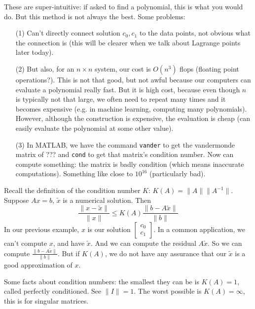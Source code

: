 \documentclass{article}
\theoremstyle{plain}
\theoremstyle{remark}
\begin{document}
These are super-intuitive: if asked to find a polynomial,
this is what you would do.
But this method is not always the best. Some problems:
\begin{enumerate}
	\item[(1)] Can't directly connect solution $c_0,c_1$ to the data points,
		not obvious what the connection is
		(this will be clearer when we talk about Lagrange points later today).
	\item[(2)] But also, for an $n \times n$ system, our cost is $O(n^3)$ flops (floating point operations?).
		This is not that good, but not awful because our computers
		can evaluate a polynomial really fast.
		But it is high cost, because even though $n$ is typically not that large,
		we often need to repeat many times and it becomes expensive
		(e.g. in machine learning, computing many polynomials).
		However, although the construction is expensive,
		the evaluation is cheap (can easily evaluate the polynomial at some other value).
	\item[(3)] In MATLAB, we have the command \verb|vander| to get the vandermonde matrix of ???
		and \verb|cond| to get that matrix's condition number.
		Now can compute something: the matrix is badly condition
		(which means inaccurate computations).
		Something like close to $10^{16}$ (particularly bad).
\end{enumerate}
Recall the definition of the condition number $K$:
$K(A) = \lVert A \rVert \lVert A^{-1} \rVert$.
Suppose $Ax = b$, $\tilde{x}$ is a numerical solution. Then
\[
	\frac{\lVert x - \tilde{x} \rVert}{\lVert x \rVert}
	\leq K(A) \frac{\lVert b - A\tilde{x}\rVert}{\lVert b \rVert}
\]
In our previous example, $x$ is our solution $\begin{bmatrix} c_0 \\ c_1 \end{bmatrix}$.
In a common application, we can't compute $x$, and have $\tilde{x}$.
And we can compute the residual $A\tilde{x}$.
So we can compute $\frac{\lVert b - A\tilde{x}\rVert}{\lVert b \rVert}$.
But if $K(A)$, we do not have any assurance that our $\tilde{x}$
is a good approximation of $x$.

Some facts about condition numbers:
the smallest they can be is $K(A) = 1$, called perfectly conditioned.
See $\lVert I \rVert = 1$.
The worst possible is $K(A) = \infty$, this is for singular matrices.
\end{document}
